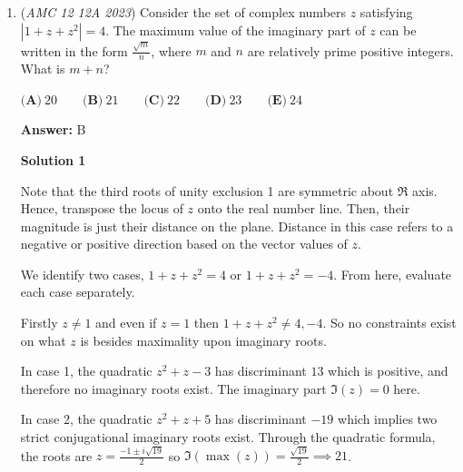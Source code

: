 \begin{enumerate}
 Their total length is

 
 \[(k_1+k_2+\cdots+k_m)r,\]

 and their total horizontal projection is

 
 \[(k_1+k_2+\cdots+k_m)r\cos\theta.\]

 If we let

 
 \[n=k_1+k_2+\cdots+k_m,\]

 then

 
 \[120=nr,\qquad 100=nr\cos\theta.\]

 So the same $n$ works for both equations, even if it is not an integer!

 Note: For those who don't know what a horizontal projection is, think about shining a flashlight on the top of the surface, which leads to only the horizontal component appearing. ~AncientKarnivore

 


	\item (\textit{AMC 12 12A 2023}) Consider the set of complex numbers $z$ satisfying $|1+z+z^{2}|=4$. The maximum value of the imaginary part of $z$ can be written in the form $\frac{\sqrt{m}}{n}$, where $m$ and $n$ are relatively prime positive integers. What is $m+n$?


 $\textbf{(A)}~20\qquad\textbf{(B)}~21\qquad\textbf{(C)}~22\qquad\textbf{(D)}~23\qquad\textbf{(E)}~24$

 \textbf{Answer: }B



\textbf{Solution 1}

Note that the third roots of unity exclusion 1 are symmetric about $\Re$ axis. Hence, transpose the locus of $z$ onto the real number line. Then, their magnitude is just their distance on the plane. Distance in this case refers to a negative or positive direction based on the vector values of $z$.

 We identify two cases, $1+z+z^2 = 4$ or $1+z+z^2 = -4$. From here, evaluate each case separately.

 Firstly $z \neq 1$ and even if $z = 1$ then $1+z+z^2 \neq 4,-4$. So no constraints exist on what $z$ is besides maximality upon imaginary roots.

 In case 1, the quadratic $z^2+z-3$ has discriminant $13$ which is positive, and therefore no imaginary roots exist. The imaginary part $\Im(z) = 0$ here.

 In case 2, the quadratic $z^2+z+5$ has discriminant $-19$ which implies two strict conjugational imaginary roots exist. Through the quadratic formula, the roots are $z = \frac{-1 \pm i\sqrt{19}}{2}$ so $\Im(\operatorname{max}(z)) = \frac{\sqrt{19}}{2} \implies \boxed{21}$.


\end{enumerate}
